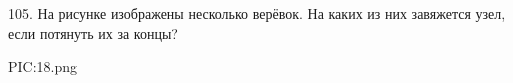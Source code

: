 105. На рисунке изображены несколько верёвок. На каких из них завяжется узел, если потянуть их за концы?
\begin{center}
{{PIC:18.png}}
\end{center}

